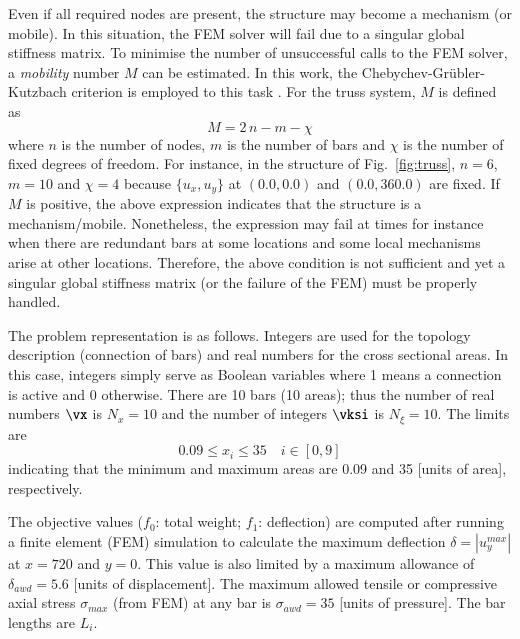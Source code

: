 \documentclass[final,5p,times,twocolumn]{elsarticle}
\newcommand{\figname} {Fig.}
\begin{document}
Even if all required nodes are present, the structure may become a mechanism (or mobile). In this
situation, the FEM solver will fail due to a singular global stiffness matrix. To minimise the
number of unsuccessful calls to the FEM solver, a \emph{mobility} number $M$ can be estimated. In
this work, the Chebychev-Gr\"{u}bler-Kutzbach criterion is employed to this task \citep{gogu:05,
li:15}. For the truss system, $M$ is defined as
\begin{equation}
    M = 2\,n - m - \chi
\label{eqn:mobility}
\end{equation}
where $n$ is the number of nodes, $m$ is the number of bars and $\chi$ is the number of fixed
degrees of freedom. For instance, in the structure of \figname~\ref{fig:truss}, $n=6$, $m=10$ and
$\chi=4$ because $\{u_x,u_y\}$ at $(0.0,0.0)$ and $(0.0,360.0)$ are fixed. If $M$ is positive, the
above expression indicates that the structure is a mechanism/mobile. Nonetheless, the expression may
fail at times for instance when there are redundant bars at some locations and some local mechanisms
arise at other locations. Therefore, the above condition is not sufficient and yet a singular global
stiffness matrix (or the failure of the FEM) must be properly handled.

The problem representation is as follows. Integers are used for the topology description (connection
of bars) and real numbers for the cross sectional areas. In this case, integers simply serve as
Boolean variables where 1 means a connection is active and 0 otherwise. There are 10 bars (10
areas); thus the number of real numbers $\vx$ is $N_x=10$ and the number of integers $\vksi$ is
$N_\xi=10$. The limits are
\begin{equation}
    0.09 \leq x_i \leq 35 \quad i \in [0,9]
\end{equation}
indicating that the minimum and maximum areas are 0.09 and 35 [units of area], respectively.

The objective values ($f_0$: total weight; $f_1$: deflection) are computed after running a finite
element (FEM) simulation to calculate the maximum deflection ${\delta=|u_y^{max}|}$ at ${x=720}$ and
${y=0}$. This value is also limited by a maximum allowance of ${\delta_{awd}=5.6}$ [units of
displacement]. The maximum allowed tensile or compressive axial stress $\sigma_{max}$ (from FEM) at
any bar is ${\sigma_{awd}=35}$ [units of pressure]. The bar lengths are $L_i$.
\end{document}

